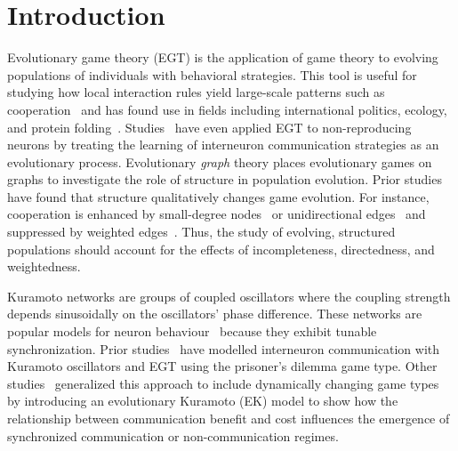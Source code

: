 \documentclass[pdflatex,lineno,referee,sn-nature]{sn-jnl}
\begin{document}
\section{Introduction}
Evolutionary game theory (EGT) is the application
of game theory to evolving populations
of individuals with behavioral strategies.
This tool is useful for studying how local interaction rules
yield large-scale patterns such as cooperation~\citep{sigmund1999evolutionary}
and has found use in fields including international politics, ecology,
and protein folding~\citep{traulsen2023future}.
Studies~\citep{cohen2009evolutionary,antonioni2017coevolution,tripp2022evolutionary}
have even applied EGT to non-reproducing neurons by treating the learning
of interneuron communication strategies as an evolutionary process.
Evolutionary \emph{graph} theory places evolutionary games
on graphs to investigate the role of structure in population evolution.
Prior studies have found that structure
qualitatively changes game evolution.
For instance, cooperation is enhanced by
small-degree nodes~\citep{ohtsuki2006simple}
or unidirectional edges~\citep{su2022evolution}
and suppressed by weighted edges~\citep{bhaumik2024constant}.
Thus, the study of evolving, structured populations
should account for the effects of
incompleteness, directedness, and weightedness.

Kuramoto networks are groups of coupled oscillators
where the coupling strength depends sinusoidally
on the oscillators' phase difference.
These networks are popular
models for neuron behaviour~\citep{cabral2011role,deng2024chimera}
because they exhibit tunable synchronization.
Prior studies~\citep{antonioni2017coevolution}
have modelled interneuron communication
with Kuramoto oscillators and EGT
using the prisoner's dilemma game type.
Other studies~\citep{tripp2022evolutionary}
generalized this approach to include dynamically changing game types
by introducing an evolutionary Kuramoto (EK) model
to show how the relationship between communication benefit and cost
influences the emergence of synchronized communication
or non-communication regimes.
\end{document}
